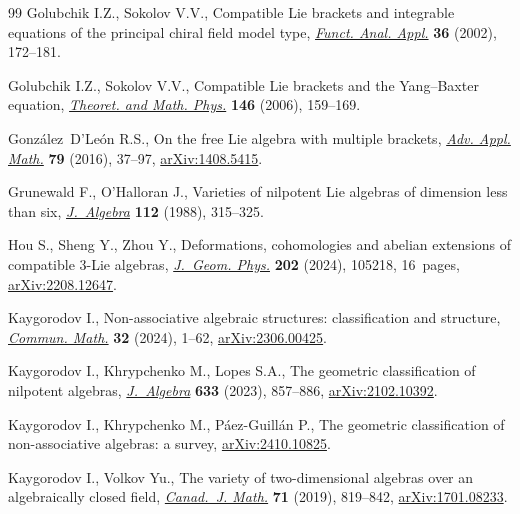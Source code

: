 \documentclass[pdftex]{sigma}
\numberwithin{equation}{section}
\begin{document}
\begin{thebibliography}{99}
Golubchik I.Z., Sokolov V.V., Compatible {L}ie brackets and integrable
 equations of the principal chiral field model type, \href{https://doi.org/10.1023/A:1020141820038}{\textit{Funct. Anal.
 Appl.}} \textbf{36} (2002), 172--181.

Golubchik I.Z., Sokolov V.V., Compatible {L}ie brackets and the
 {Y}ang--{B}axter equation, \href{https://doi.org/10.1007/s11232-006-0016-6}{\textit{Theoret. and Math. Phys.}} \textbf{146}
 (2006), 159--169.

Gonz\'alez~D'Le\'on R.S., On the free {L}ie algebra with multiple brackets,
 \href{https://doi.org/10.1016/j.aam.2016.02.008}{\textit{Adv. Appl. Math.}} \textbf{79} (2016), 37--97, \href{https://arxiv.org/abs/1408.5415}{arXiv:1408.5415}.

Grunewald F., O'Halloran J., Varieties of nilpotent {L}ie algebras of dimension
 less than six, \href{https://doi.org/10.1016/0021-8693(88)90093-2}{\textit{J.~Algebra}} \textbf{112} (1988), 315--325.

Hou S., Sheng Y., Zhou Y., Deformations, cohomologies and abelian extensions of
 compatible 3-{L}ie algebras, \href{https://doi.org/10.1016/j.geomphys.2024.105218}{\textit{J.~Geom. Phys.}} \textbf{202} (2024),
 105218, 16~pages, \href{https://arxiv.org/abs/2208.12647}{arXiv:2208.12647}.

Kaygorodov I., Non-associative algebraic structures: classification and
 structure, \href{https://doi.org/10.46298/cm.11419}{\textit{Commun. Math.}} \textbf{32} (2024), 1--62,
 \href{https://arxiv.org/abs/2306.00425}{arXiv:2306.00425}.

Kaygorodov I., Khrypchenko M., Lopes S.A., The geometric classification of
 nilpotent algebras, \href{https://doi.org/10.1016/j.jalgebra.2023.04.028}{\textit{J.~Algebra}} \textbf{633} (2023), 857--886,
 \href{https://arxiv.org/abs/2102.10392}{arXiv:2102.10392}.

Kaygorodov I., Khrypchenko M., P\'aez-Guill\'an P., The geometric
 classification of non-associative algebras: a survey, \href{https://arxiv.org/abs/2410.10825}{arXiv:2410.10825}.

Kaygorodov I., Volkov Yu., The variety of two-dimensional algebras over an
 algebraically closed field, \href{https://doi.org/10.4153/s0008414x18000056}{\textit{Canad.~J. Math.}} \textbf{71} (2019),
 819--842, \href{https://arxiv.org/abs/1701.08233}{arXiv:1701.08233}.


\end{thebibliography}
\end{document}
